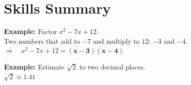 \documentclass[12pt]{article}
\newcommand{\ans}[1]{\boldsymbol{#1}}
\begin{document}
\section*{Skills Summary}

\begin{examplebox}
\textbf{Example:} Factor $x^2 - 7x + 12$.\\
Two numbers that add to $-7$ and multiply to $12$: $-3$ and $-4$.\\
$\Rightarrow\quad x^2 - 7x + 12 = \ans{(x-3)(x-4)}$
\end{examplebox}

\begin{examplebox}
\textbf{Example:} Estimate $\sqrt{2}$ to two decimal places.\\
$\sqrt{2} \approx \ans{1.41}$
\end{examplebox}
\end{document}
